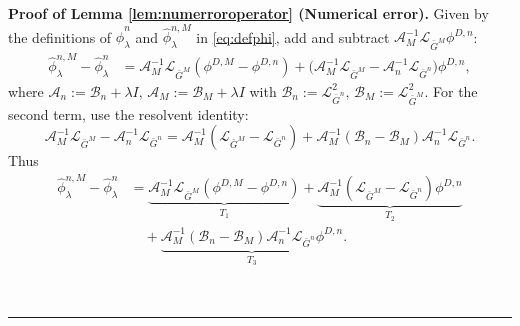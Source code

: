 \documentclass[12pt]{article}
\newenvironment{proof}[1][Proof]{\noindent\textbf{#1.} }{\ \rule{0.5em}{0.5em}}
\numberwithin{equation}{section}
\numberwithin{theorem}{section}
\begin{document}
\begin{proof}[Proof of Lemma \ref{lem:numerroroperator} (Numerical error)]
Given by the definitions of $\hat{\phi}_\lambda^n$ and $\hat{\phi}_\lambda^{n,M}$ in \eqref{eq:defphi}, add and subtract $\mathcal{A}_M^{-1}\mathcal{L}_{\bar{G}^M}\phi^{D,n}$:
$$
\begin{aligned}
\hat{\phi}_\lambda^{n,M}-\hat{\phi}_\lambda^n
&= \mathcal{A}_M^{-1}\mathcal{L}_{\bar{G}^M}(\phi^{D,M}-\phi^{D,n}) + \bigl(\mathcal{A}_M^{-1}\mathcal{L}_{\bar{G}^M} - \mathcal{A}_n^{-1}\mathcal{L}_{\bar{G}^n}\bigr)\phi^{D,n},
\end{aligned}
$$
where $\mathcal{A}_n := \mathcal{B}_n + \lambda I,\, \mathcal{A}_M := \mathcal{B}_M + \lambda I$ with $\mathcal{B}_n := \mathcal{L}_{\bar{G}^n}^2,\,
\mathcal{B}_M := \mathcal{L}_{\bar{G}^M}^2$. For the second term, use the resolvent identity:
$$
\mathcal{A}_M^{-1}\mathcal{L}_{\bar{G}^M}
 - \mathcal{A}_n^{-1}\mathcal{L}_{\bar{G}^n}
= \mathcal{A}_M^{-1}(\mathcal{L}_{\bar{G}^M}-\mathcal{L}_{\bar{G}^n})
 + \mathcal{A}_M^{-1}(\mathcal{B}_n-\mathcal{B}_M)\mathcal{A}_n^{-1}
   \mathcal{L}_{\bar{G}^n}.
$$
Thus
$$
\begin{aligned}
\hat{\phi}_\lambda^{n,M}-\hat{\phi}_\lambda^n
&= \underbrace{\mathcal{A}_M^{-1}\mathcal{L}_{\bar{G}^M}(\phi^{D,M}-\phi^{D,n})}_{T_1}
 + \underbrace{\mathcal{A}_M^{-1}(\mathcal{L}_{\bar{G}^M}-\mathcal{L}_{\bar{G}^n})\phi^{D,n}}_{T_2}
\\
&\quad
 + \underbrace{\mathcal{A}_M^{-1}(\mathcal{B}_n-\mathcal{B}_M)\mathcal{A}_n^{-1}\mathcal{L}_{\bar{G}^n}\phi^{D,n}}_{T_3}.
\end{aligned}
$$


\end{proof}
\end{document}
